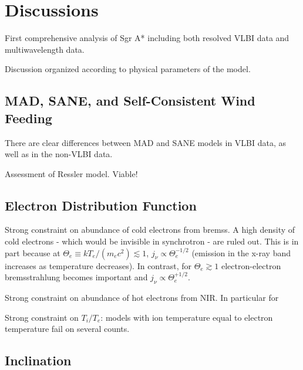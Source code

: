\section{Discussions}\label{sec:discussions}

First comprehensive analysis of Sgr A* including both resolved VLBI data and multiwavelength data.

Discussion organized according to physical parameters of the model.


\subsection{MAD, SANE, and Self-Consistent Wind Feeding}


There are clear differences between MAD and SANE models in VLBI data, as well as in the non-VLBI data.

Assessment of Ressler model.  Viable!

\subsection{Electron Distribution Function}


Strong constraint on abundance of cold electrons from bremss.  A high density of cold electrons - which would be invisible in synchrotron - are ruled out.  This is in part because at $\Theta_e \equiv k T_e/(m_e c^2) \lesssim 1$, $j_\nu \propto \Theta_e^{-1/2}$ (emission in the x-ray band increases as temperature decreases).  In contrast, for $\Theta_e \gtrsim 1$ electron-electron bremsstrahlung becomes important and $j_\nu \propto \Theta_e^{+1/2}$.

Strong constraint on abundance of hot electrons from NIR.  In particular for

Strong constraint on $T_i/T_e$: models with ion temperature equal to electron temperature fail on several counts.

\subsection{Inclination}

